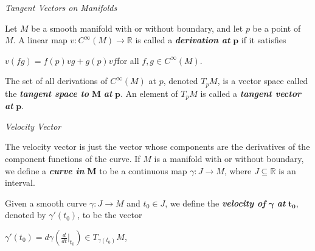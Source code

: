 \documentclass[12pt, a4paper]{article}
\begin{document}
\vspace{6mm}

\begin{flushleft}
\textit{\large{Tangent Vectors on Manifolds}}
\end{flushleft}


Let $M$ be a smooth manifold with or without boundary, and let $p$ be a point of $M$. A linear map $v\colon C^{\infty}(M)\rightarrow\mathbb{R}$ is called a \textit{\textbf{derivation at}} $\bm{p}$ if it satisfies\par

\vspace{4mm}

\centerline{$v(fg)=f(p)vg+g(p)vf$\hspace{5mm}for all $f,g\in C^{\infty}(M)$.}

\vspace{4mm}

The set  of all derivations of $C^{\infty}(M)$ at $p$, denoted $T_pM$, is a vector space called the \textit{\textbf{tangent space to}} $\bm{M}$ \textit{\textbf{at}} $\bm{p}$. An element of $T_pM$ is called a \textit{\textbf{tangent vector at}} $\bm{p}$.



\vspace{6mm}

\begin{flushleft}

\textit{\large{Velocity Vector}}

\end{flushleft}


The velocity vector is just the vector whose components are the derivatives of the component functions of the curve.
If $M$ is a manifold with or without boundary, we define a \textit{\textbf{curve in}} $\bm{M}$ to be a continuous map $\gamma\colon J\rightarrow M$, where $J\subseteq\mathbb{R}$ is an interval.\par

Given a smooth curve $\gamma\colon J\rightarrow M$ and $t_0\in J$, we define the \textit{\textbf{velocity of}} $\bm{\gamma}$ \textit{\textbf{at}} $\bm{t_0}$, denoted by $\gamma'(t_0)$, to be the vector\par

\vspace{4mm}

\centerline{\large{$\gamma'(t_0)=d\gamma(\tfrac{d}{dt}\Big|_{t_0})\in T_{\gamma(t_0)}M$},}

\vspace{4mm}
\end{document}
